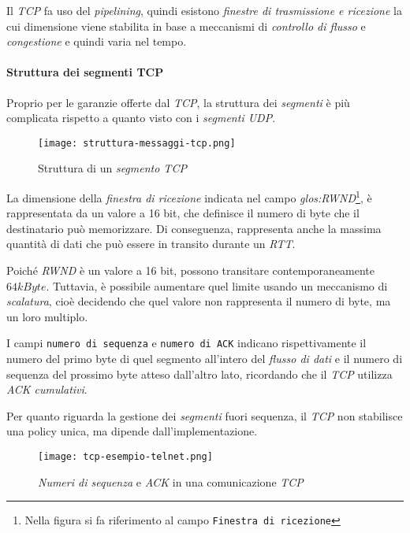 Il \emph{TCP} fa uso del \emph{pipelining}, quindi esistono \emph{finestre di
trasmissione e ricezione} la cui dimensione viene stabilita in base a meccanismi
di \emph{controllo di flusso} e \emph{congestione} e quindi varia nel tempo.

\paragraph{Struttura dei segmenti TCP}
Proprio per le garanzie offerte dal \emph{TCP}, la struttura dei \emph{segmenti}
è più complicata rispetto a quanto visto con i \emph{segmenti UDP}.

\begin{figure}[ht]
    \centering
    \texttt{[image: struttura-messaggi-tcp.png]}
    \caption{Struttura di un \emph{segmento TCP}}
\end{figure}
La dimensione della \emph{finestra di ricezione} indicata nel campo
\emph{\gls{glos:RWND}}\footnote{Nella figura si fa riferimento al campo
\texttt{Finestra di ricezione}}, è rappresentata da un valore a 16 bit,
che definisce il numero di byte che il destinatario può memorizzare. Di
conseguenza, rappresenta anche la massima quantità di dati che può essere
in transito durante un \emph{RTT}.

\noindent
Poiché \emph{RWND} è un valore a 16 bit, possono transitare contemporaneamente
$64kByte$. Tuttavia, è possibile aumentare quel limite usando un meccanismo di
\emph{scalatura}, cioè decidendo che quel valore non rappresenta il numero di
byte, ma un loro multiplo.

I campi \texttt{numero di sequenza} e \texttt{numero di ACK} indicano
rispettivamente il numero del primo byte di quel segmento all'intero del
\emph{flusso di dati} e il numero di sequenza del prossimo byte atteso dall'altro
lato, ricordando che il \emph{TCP} utilizza \emph{ACK cumulativi}.

\begin{note}
    Per quanto riguarda la gestione dei \emph{segmenti} fuori sequenza, il
    \emph{TCP} non stabilisce una policy unica, ma dipende dall'implementazione.
\end{note}

\begin{figure}[h!]
    \centering
    \texttt{[image: tcp-esempio-telnet.png]}
    \caption{\emph{Numeri di sequenza} e \emph{ACK} in una comunicazione \emph{TCP}}
\end{figure}

